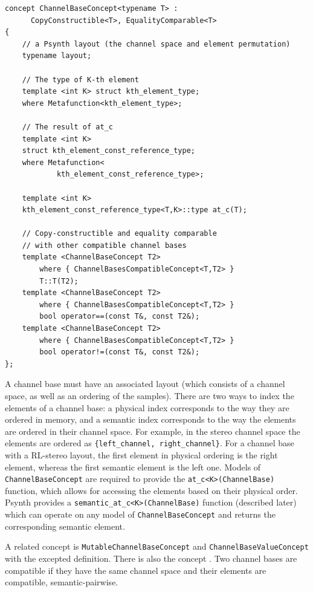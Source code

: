 \begin{lstlisting}
concept ChannelBaseConcept<typename T> :
      CopyConstructible<T>, EqualityComparable<T>
{
    // a Psynth layout (the channel space and element permutation)
    typename layout;     
        
    // The type of K-th element
    template <int K> struct kth_element_type;
    where Metafunction<kth_element_type>;
    
    // The result of at_c
    template <int K> 
    struct kth_element_const_reference_type;
    where Metafunction<
            kth_element_const_reference_type>;        
    
    template <int K> 
    kth_element_const_reference_type<T,K>::type at_c(T);

    // Copy-constructible and equality comparable 
    // with other compatible channel bases
    template <ChannelBaseConcept T2> 
        where { ChannelBasesCompatibleConcept<T,T2> } 
        T::T(T2);
    template <ChannelBaseConcept T2> 
        where { ChannelBasesCompatibleConcept<T,T2> } 
        bool operator==(const T&, const T2&);
    template <ChannelBaseConcept T2> 
        where { ChannelBasesCompatibleConcept<T,T2> } 
        bool operator!=(const T&, const T2&);
};
\end{lstlisting}

A channel base must have an associated layout (which consists of a
channel space, as well as an ordering of the samples).  There are two
ways to index the elements of a channel base: a physical index
corresponds to the way they are ordered in memory, and a semantic
index corresponds to the way the elements are ordered in their channel
space.  For example, in the stereo channel space the elements are
ordered as \texttt{\{left\_channel, right\_channel\}}. For a channel
base with a RL-stereo layout, the first element in physical ordering
is the right element, whereas the first semantic element is the left
one.  Models of \texttt{ChannelBaseConcept} are required to provide
the \texttt{at\_c<K>(ChannelBase)} function, which allows for
accessing the elements based on their physical order. Psynth provides
a \texttt{semantic\_at\_c<K>(ChannelBase)} function (described
later) which can operate on any model of \texttt{ChannelBaseConcept}
and returns the corresponding semantic element.

A related concept is \texttt{Mutable\-Channel\-Base\-Con\-cept} and
\texttt{Chan\-nel\-Base\-Value\-Con\-cept} with the excepted
definition. There is also the concept
. Two channel bases are
compatible if they have the same channel space and their elements are
compatible, semantic-pairwise.

